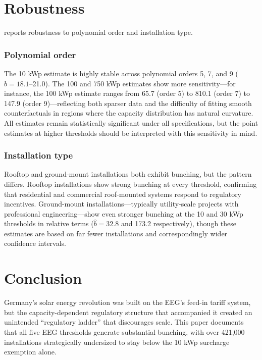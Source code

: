\documentclass[12pt]{article}
\begin{document}
\section{Robustness}
\label{sec:robustness}

 reports robustness to polynomial order and installation type.



\subsubsection*{Polynomial order} The 10 kWp estimate is highly stable across polynomial orders 5, 7, and 9 ($\hat{b} = 18.1$--21.0). The 100 and 750 kWp estimates show more sensitivity---for instance, the 100 kWp estimate ranges from 65.7 (order 5) to 810.1 (order 7) to 147.9 (order 9)---reflecting both sparser data and the difficulty of fitting smooth counterfactuals in regions where the capacity distribution has natural curvature. All estimates remain statistically significant under all specifications, but the point estimates at higher thresholds should be interpreted with this sensitivity in mind.

\subsubsection*{Installation type} Rooftop and ground-mount installations both exhibit bunching, but the pattern differs. Rooftop installations show strong bunching at every threshold, confirming that residential and commercial roof-mounted systems respond to regulatory incentives. Ground-mount installations---typically utility-scale projects with professional engineering---show even stronger bunching at the 10 and 30 kWp thresholds in relative terms ($\hat{b} = 32.8$ and 173.2 respectively), though these estimates are based on far fewer installations and correspondingly wider confidence intervals.


\section{Conclusion}
\label{sec:conclusion}

Germany's solar energy revolution was built on the EEG's feed-in tariff system, but the capacity-dependent regulatory structure that accompanied it created an unintended ``regulatory ladder'' that discourages scale. This paper documents that all five EEG thresholds generate substantial bunching, with over 421,000 installations strategically undersized to stay below the 10 kWp surcharge exemption alone.
\end{document}
